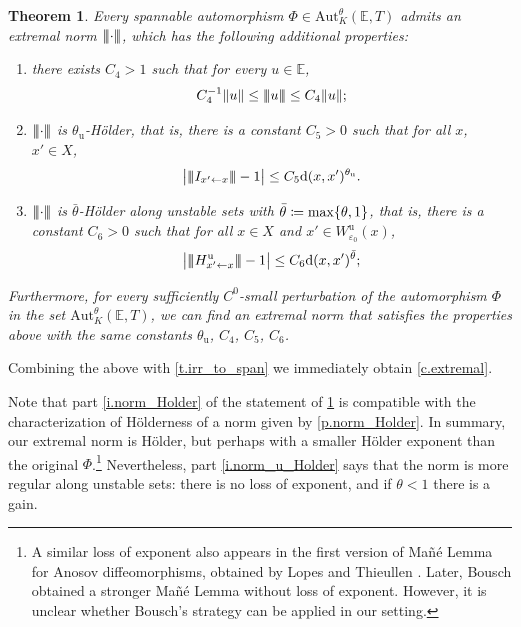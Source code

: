 \documentclass[10pt]{amsart}
\def\vcentcolon{\mathrel{\mathop\ordinarycolon}}
\providecommand\ordinarycolon{:}
\providecommand*\coloneqq{\vcentcolon\mathrel{\mkern-1.2mu}=}
\theoremstyle{plain}
\newtheorem{theorem}{Theorem}[section]
\theoremstyle{definition}
\newcommand{\tribar}[1]{\mathopen{| {\kern -1.5pt} | {\kern -1.5pt} |} {#1}
\mathclose{| {\kern -1.5pt} | {\kern -1.5pt} |}}
\newcommand{\EE}{\mathbb{E}}
\newcommand{\dd}{\mathrm{d}}
\newcommand{\uu}{\mathrm{u}}
\newcommand{\Aut}{\mathrm{Aut}}
\let\epsilon\varepsilon
\begin{document}
\begin{theorem}\label{t.extremal}
Every spannable automorphism $\Phi \in \Aut^\theta_K(\EE,T)$ admits an extremal norm $\tribar{\mathord{\cdot}}$,
which has the following additional properties:
\begin{enumerate}

\item\label{i.norm_eccentricity}
there exists $C_4 > 1$ such that for every $u \in \EE$,
\begin{equation}\label{e.eccentricity}
C_4^{-1} \|u\| \le \tribar{u} \le C_4 \|u\| ;
\end{equation}

\item\label{i.norm_Holder}
$\tribar{\mathord{\cdot}}$ is $\theta_\uu$-Hölder, that is, there is a constant $C_5>0$ such that for all $x$, $x'\in X$,%
\begin{equation}\label{e.norm_Holder}
\big| \tribar{I_{x' \gets x}} - 1 \big| \le C_5 \dd(x,x')^{\theta_\uu}.
\end{equation}

\item\label{i.norm_u_Holder}
$\tribar{\mathord{\cdot}}$ is $\bar\theta$-Hölder along unstable sets with $\bar\theta \coloneqq \max\{\theta,1\}$, that is, there is a constant $C_6>0$ such that for all $x \in X$ and $x' \in W^\uu_{\epsilon_0}(x)$,
\begin{equation}\label{e.norm_u_Holder}
\big| \tribar{H^\uu_{x' \gets x}} - 1 \big| \le C_6 \dd(x,x')^{\bar\theta} ;
\end{equation}

\end{enumerate}
Furthermore, for every sufficiently $C^0$-small perturbation of the automorphism $\Phi$ in the set $\Aut^\theta_K(\EE,T)$, we can find an extremal norm that satisfies the properties above with the same constants $\theta_\uu$, $C_4$, $C_5$, $C_6$.

\end{theorem}


Combining the  above with \cref{t.irr_to_span} we immediately obtain \cref{c.extremal}.

Note that part \eqref{i.norm_Holder} of the statement of \cref{t.extremal} is compatible with the characterization of Hölderness of a norm given by \cref{p.norm_Holder}.
In summary, our extremal norm is Hölder, but perhaps with a smaller Hölder exponent than the original $\Phi$.\footnote{A similar loss of exponent also appears in the first version of Mañé Lemma for Anosov diffeomorphisms, obtained by Lopes and Thieullen \cite{LopesT}. Later, Bousch \cite{Bousch_amphi} obtained a stronger Mañé Lemma without loss of exponent. However, it is unclear whether Bousch's strategy can be applied in our setting.}
Nevertheless, part \eqref{i.norm_u_Holder} says that the norm is more regular along unstable sets: there is no loss of exponent, and if $\theta<1$ there is a gain.
\end{document}
